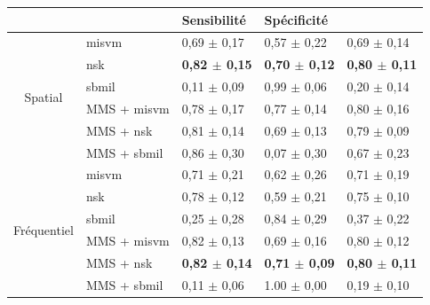 \begin{table}[H]
    \centering
    \begin{tabular}{cllll}
        \toprule
        \multicolumn{1}{l}{}         &                          & Sensibilité               & Spécificité               & \Fscore{}                 \\ \midrule
        \multirow{6}{*}{Spatial}     & \gls{misvm}              & 0,69 $\pm$ 0,17             & 0,57 $\pm$ 0,22             & 0,69 $\pm$ 0,14             \\
                                     & \gls{nsk}                & \textbf{0,82 $\pm$ 0,15}    & \textbf{0,70 $\pm$ 0,12}    & \textbf{0,80 $\pm$ 0,11}    \\
                                     & \gls{sbmil}              & 0,11 $\pm$ 0,09             & 0,99 $\pm$ 0,06             & 0,20 $\pm$ 0,14             \\
                                     & MMS + \gls{misvm}        & 0,78 $\pm$ 0,17             & 0,77 $\pm$ 0,14             & 0,80 $\pm$ 0,16             \\
                                     & MMS + \gls{nsk}          & 0,81 $\pm$ 0,14             & 0,69 $\pm$ 0,13             & 0,79 $\pm$ 0,09             \\
                                     & MMS + \gls{sbmil}        & 0,86 $\pm$ 0,30             & 0,07 $\pm$ 0,30             & 0,67 $\pm$ 0,23             \\ \midrule
        \multirow{6}{*}{Fréquentiel} & \gls{misvm}              & 0,71 $\pm$ 0,21             & 0,62 $\pm$ 0,26             & 0,71 $\pm$ 0,19             \\
                                     & \gls{nsk}                & 0,78 $\pm$ 0,12             & 0,59 $\pm$ 0,21             & 0,75 $\pm$ 0,10             \\
                                     & \gls{sbmil}              & 0,25 $\pm$ 0,28             & 0,84 $\pm$ 0,29             & 0,37 $\pm$ 0,22             \\
                                     & MMS + \gls{misvm}        & 0,82 $\pm$ 0,13             & 0,69 $\pm$ 0,16             & 0,80 $\pm$ 0,12             \\
                                     & MMS + \gls{nsk}          & \textbf{0,82 $\pm$ 0,14}    & \textbf{0,71 $\pm$ 0,09}    & \textbf{0,80 $\pm$ 0,11}    \\
                                     & MMS + \gls{sbmil}        & 0,11 $\pm$ 0,06             & 1.00 $\pm$ 0,00             & 0,19 $\pm$ 0,10             \\ \midrule

\end{tabular}
\end{table}

